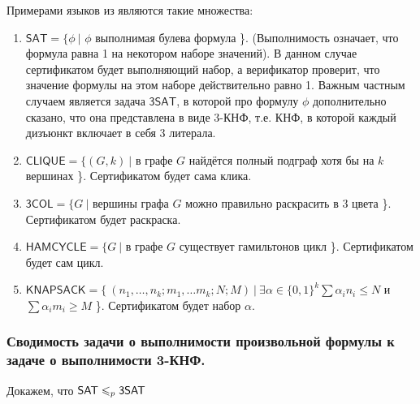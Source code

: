 \begin{example} Примерами языков из
\np являются такие множества:

\begin{enumerate}
    \item $ \mathsf{SAT} = \{\phi \ | $ $\phi$ выполнимая булева формула \}.   (Выполнимость означает, что формула равна 1 на некотором наборе значений). В данном случае сертификатом будет выполняющий набор, а верификатор проверит, что значение формулы на этом наборе действительно равно 1. Важным частным случаем является задача $\mathsf{3SAT}$, в которой про формулу $\phi$ дополнительно сказано, что она представлена в виде 3-КНФ, т.е. КНФ, в которой каждый дизъюнкт включает в себя 3 литерала.
    \item $ \mathsf{CLIQUE} = \{(G,k) \ | $ в графе $G$ найдётся полный подграф хотя бы на $k$ вершинах \}. Сертификатом будет сама клика.
    \item $ \mathsf{3COL} = \{G \ | $ вершины графа $G$ можно правильно раскрасить в 3 цвета \}. Сертификатом будет раскраска.
    \item $ \mathsf{HAMCYCLE} = \{G \ | $ в графе $G$ существует гамильтонов цикл \}. Сертификатом будет сам цикл.
    \item $ \mathsf{KNAPSACK} = \{ \ (n_1,\ldots, n_k; m_1, \ldots m_k; N; M) \ | \ \exists \alpha \in \{0,1\}^k \sum{\alpha_i n_i} \leq N$ и $\sum{\alpha_i m_i} \geq M$  \}. Сертификатом будет набор $\alpha$.
\end{enumerate}
\end{example}

\subsubsection{Сводимость задачи о выполнимости произвольной формулы к задаче о выполнимости 3-КНФ.}

\begin{statement}
Докажем, что $\mathsf{SAT} \leqslant_p \mathsf{3SAT}$
\end{statement}

